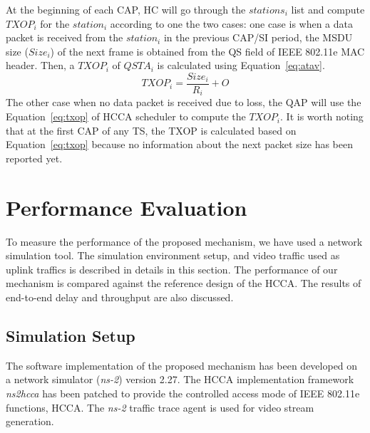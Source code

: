\documentclass[a4paper, conference]{IEEEtran}
\begin{document}
At the beginning of each CAP, HC will go through the $stations_{i}$ list and compute $TXOP_{i}$ for the $station_{i}$ according to one the two cases: one case is when a data packet is received from the $station_{i}$ in the previous CAP/SI period, the MSDU size ($Size_{i}$) of the next frame is obtained from the QS field of IEEE 802.11e MAC header. Then, a $TXOP_{i}$ of $QSTA_{i}$ is calculated using Equation~\eqref{eq:atav}. 
\begin{equation}
TXOP_{i}= \frac{Size_{i}}{R_{i}} + O
\label{eq:atav}
\end{equation}
The other case when no data packet is received due to loss, the QAP will use the Equation~\eqref{eq:txop} of  HCCA scheduler to compute the $TXOP_{i}$. It is worth noting that at the first CAP of any TS, the TXOP is calculated based on Equation~\eqref{eq:txop} because no information about the next packet size has been reported yet.

\section{Performance Evaluation}
\label{sec:evaluation}
To measure the performance of the proposed mechanism, we have used a network simulation tool. The simulation environment setup, and video traffic used as uplink traffics is described in details in this section. The performance of our mechanism is compared against the reference design of the HCCA. The results of end-to-end delay and throughput are also discussed.
\subsection{Simulation Setup}
The software implementation of the proposed mechanism has been developed on a network simulator (\textit{ns-2}) \cite{NS2} version 2.27. The HCCA implementation framework \textit{ns2hcca} \cite{cicconetti2005} has been patched to provide the controlled access mode of IEEE 802.11e functions, HCCA. The \textit{ns-2} traffic trace agent is used for video stream generation.
\end{document}
